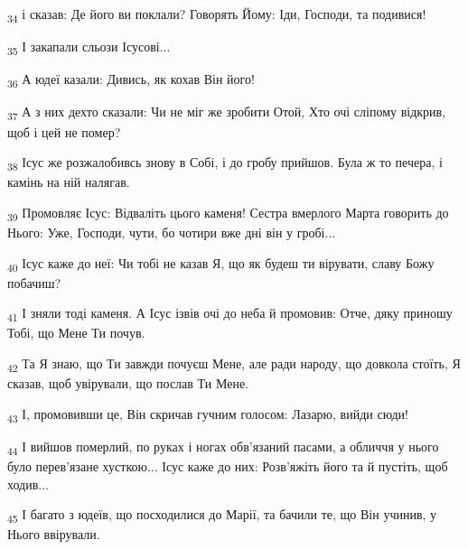 \begin{tcolorbox}
\textsubscript{34} і сказав: Де його ви поклали? Говорять Йому: Іди, Господи, та подивися!
\end{tcolorbox}
\begin{tcolorbox}
\textsubscript{35} І закапали сльози Ісусові...
\end{tcolorbox}
\begin{tcolorbox}
\textsubscript{36} А юдеї казали: Дивись, як кохав Він його!
\end{tcolorbox}
\begin{tcolorbox}
\textsubscript{37} А з них дехто сказали: Чи не міг же зробити Отой, Хто очі сліпому відкрив, щоб і цей не помер?
\end{tcolorbox}
\begin{tcolorbox}
\textsubscript{38} Ісус же розжалобивсь знову в Собі, і до гробу прийшов. Була ж то печера, і камінь на ній налягав.
\end{tcolorbox}
\begin{tcolorbox}
\textsubscript{39} Промовляє Ісус: Відваліть цього каменя! Сестра вмерлого Марта говорить до Нього: Уже, Господи, чути, бо чотири вже дні він у гробі...
\end{tcolorbox}
\begin{tcolorbox}
\textsubscript{40} Ісус каже до неї: Чи тобі не казав Я, що як будеш ти вірувати, славу Божу побачиш?
\end{tcolorbox}
\begin{tcolorbox}
\textsubscript{41} І зняли тоді каменя. А Ісус ізвів очі до неба й промовив: Отче, дяку приношу Тобі, що Мене Ти почув.
\end{tcolorbox}
\begin{tcolorbox}
\textsubscript{42} Та Я знаю, що Ти завжди почуєш Мене, але ради народу, що довкола стоїть, Я сказав, щоб увірували, що послав Ти Мене.
\end{tcolorbox}
\begin{tcolorbox}
\textsubscript{43} І, промовивши це, Він скричав гучним голосом: Лазарю, вийди сюди!
\end{tcolorbox}
\begin{tcolorbox}
\textsubscript{44} І вийшов померлий, по руках і ногах обв'язаний пасами, а обличчя у нього було перев'язане хусткою... Ісус каже до них: Розв'яжіть його та й пустіть, щоб ходив...
\end{tcolorbox}
\begin{tcolorbox}
\textsubscript{45} І багато з юдеїв, що посходилися до Марії, та бачили те, що Він учинив, у Нього ввірували.
\end{tcolorbox}
